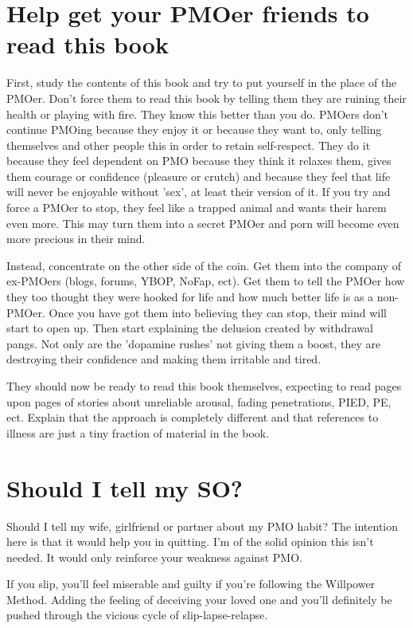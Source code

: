\documentclass[easypeasy.tex]{subfiles}
\begin{document}
\section{Help get your PMOer friends to read this book}

First, study the contents of this book and try to put yourself in the place of the PMOer. Don't force them to read this book by telling them they are ruining their health or playing with fire. They know this better than you do. PMOers don't continue PMOing because they enjoy it or because they want to, only telling themselves and other people this in order to retain self-respect. They do it because they feel dependent on PMO because they think it relaxes them, gives them courage or confidence (pleasure or crutch) and because they feel that life will never be enjoyable without 'sex', at least their version of it. If you try and force a PMOer to stop, they feel like a trapped animal and wants their harem even more. This may turn them into a secret PMOer and porn will become even more precious in their mind.

Instead, concentrate on the other side of the coin. Get them into the company of ex-PMOers (blogs, forums, YBOP, NoFap, ect). Get them to tell the PMOer how they too thought they were hooked for life and how much better life is as a non-PMOer. Once you have got them into believing they can stop, their mind will start to open up. Then start explaining the delusion created by withdrawal pangs. Not only are the 'dopamine rushes' not giving them a boost, they are destroying their confidence and making them irritable and tired.

They should now be ready to read this book themselves, expecting to read pages upon pages of stories about unreliable arousal, fading penetrations, PIED, PE, ect. Explain that the approach is completely different and that references to illness are just a tiny fraction of material in the book.

\section{Should I tell my SO?}

Should I tell my wife, girlfriend or partner about my PMO habit? The intention here is that it would help you in quitting. I'm of the solid opinion this isn't needed. It would only reinforce your weakness against PMO.

If you slip, you'll feel miserable and guilty if you're following the Willpower Method. Adding the feeling of deceiving your loved one and you'll definitely be pushed through the vicious cycle of slip-lapse-relapse.
\end{document}
